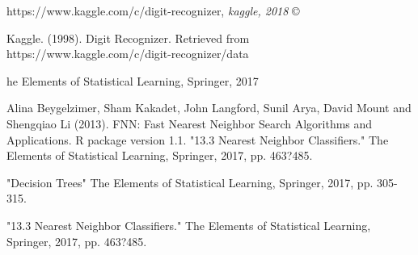\documentclass[11pt, oneside]{article}   	%
\begin{document}
\begin{thebibliography}{9}

https://www.kaggle.com/c/digit-recognizer, \textit{kaggle, 2018} \copyright
 
Kaggle. (1998). Digit Recognizer. Retrieved from https://www.kaggle.com/c/digit-recognizer/data 

he Elements of Statistical Learning, Springer, 2017

Alina Beygelzimer, Sham Kakadet, John Langford, Sunil Arya, David Mount and Shengqiao
  Li (2013). FNN: Fast Nearest Neighbor Search Algorithms and Applications. R package
  version 1.1.
"13.3 Nearest Neighbor Classifiers." The Elements of Statistical Learning, Springer, 2017, pp. 463?485. 

"Decision Trees" The Elements of Statistical Learning, Springer, 2017, pp. 305-315.

"13.3 Nearest Neighbor Classifiers." The Elements of Statistical Learning, Springer, 2017, pp. 463?485.
 
\end{thebibliography}
\end{document}
